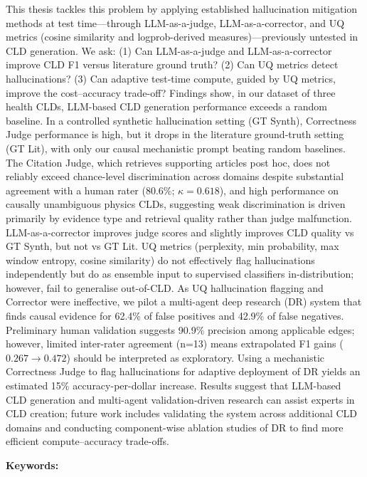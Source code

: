 \documentclass[11pt, oneside]{Thesis} %
\begin{document}
{This thesis tackles this problem by applying established hallucination mitigation methods at test time---through LLM-as-a-judge, LLM-as-a-corrector, and UQ metrics (cosine similarity and logprob-derived measures)---previously untested in CLD generation. We ask: (1) Can LLM-as-a-judge and LLM-as-a-corrector improve CLD F1 versus literature ground truth? (2) Can UQ metrics detect hallucinations? (3) Can adaptive test-time compute, guided by UQ metrics, improve the cost--accuracy trade-off? Findings show, in our dataset of three health CLDs, LLM-based CLD generation performance exceeds a random baseline. In a controlled synthetic hallucination setting (GT Synth), Correctness Judge performance is high, but it drops in the literature ground-truth setting (GT Lit), with only our causal mechanistic prompt beating random baselines. The Citation Judge, which retrieves supporting articles post hoc, does not reliably exceed chance-level discrimination across domains despite substantial agreement with a human rater (80.6\%; $\kappa=0.618$), and high performance on causally unambiguous physics CLDs, suggesting weak discrimination is driven primarily by evidence type and retrieval quality rather than judge malfunction. LLM-as-a-corrector improves judge scores and slightly improves CLD quality vs GT Synth, but not vs GT Lit. UQ metrics (perplexity, min probability, max window entropy, cosine similarity) do not effectively flag hallucinations independently but do as ensemble input to supervised classifiers in-distribution; however, fail to generalise out-of-CLD. As UQ hallucination flagging and Corrector were ineffective, we pilot a multi-agent deep research (DR) system that finds causal evidence for 62.4\% of false positives and 42.9\% of false negatives. Preliminary human validation suggests 90.9\% precision among applicable edges; however, limited inter-rater agreement (n=13) means extrapolated F1 gains ($0.267 \to 0.472$) should be interpreted as exploratory. Using a mechanistic Correctness Judge to flag hallucinations for adaptive deployment of DR yields an estimated 15\% accuracy-per-dollar increase. Results suggest that LLM-based CLD generation and multi-agent validation-driven research can assist experts in CLD creation; future work includes validating the system across additional CLD domains and conducting component-wise ablation studies of DR to find more efficient compute--accuracy trade-offs.

\vspace{0.75em}
\noindent\textbf{Keywords:} \keywordnames
}
\end{document}
